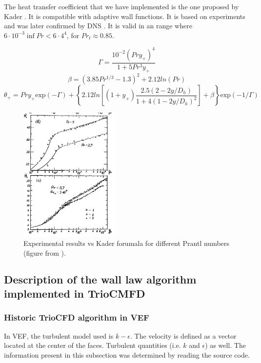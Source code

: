 The heat transfer coefficient that we have implemented is the one proposed by Kader \cite{Kader1981}. It is compatible with adaptive wall functions. It is based on experiments and was later confirmed by DNS \cite{Mitrovic2004}. It is valid in an range where $6\cdot10^{-3}\inf Pr<6\cdot4^{4}$, for $Pr_t\approx0.85$.

\begin{equation}
	\Gamma = \frac{10^{-2}(Pr y_+)^4}{1+5Pr^3y_+}
\end{equation}
\begin{equation}
	\beta = (3.85Pr^{1/3}-1.3)^2+2.12ln(Pr)
\end{equation}
\begin{equation}
	\theta_+ = Pr y_+ \text{exp}(-\Gamma) +\left\{ 2.12ln\left[(1+y_+)\frac{2.5(2-2y/D_h)}{1+4(1-2y/D_h)^2}\right]+\beta\right\}\text{exp}(-1/\Gamma)
\end{equation}

\begin{figure}[h]
	\centering
	\includegraphics[width= 5cm]{Kader_T.png}
	\caption{Experimental results vs Kader forumala for different Prantl numbers (figure from \cite{Kader1981}).}
\end{figure}

\subsection{Description of the wall law algorithm implemented in TrioCMFD}

\subsubsection{Historic TrioCFD algorithm in VEF}

In VEF, the turbulent model used is $k-\epsilon$. The velocity is defined as a vector located at the center of the faces. Turbulent quantities (i.e. $k$ and $\epsilon$) as well. The information present in this subsection was determined by reading the source code.

